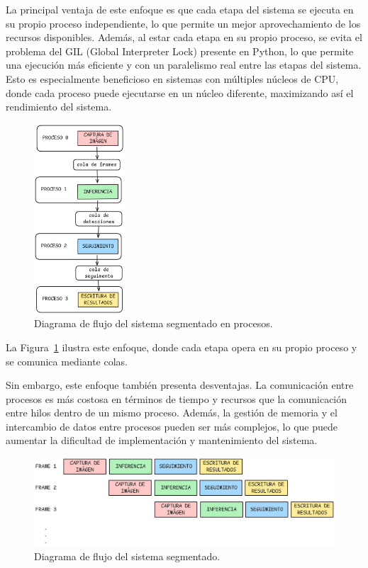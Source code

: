 \documentclass[11pt,spanish,listoffigures,listoftables]{tfgetsinf}
\begin{document}
La principal ventaja de este enfoque es que cada etapa del sistema se ejecuta en su propio proceso independiente, lo que permite un mejor aprovechamiento de los recursos disponibles. Además, al estar cada etapa en su propio proceso, se evita el problema del GIL (Global Interpreter Lock) presente en Python, lo que permite una ejecución más eficiente y con un paralelismo real entre las etapas del sistema. Esto es especialmente beneficioso en sistemas con múltiples núcleos de CPU, donde cada proceso puede ejecutarse en un núcleo diferente, maximizando así el rendimiento del sistema.

\begin{figure}[H]
   \centering
   \includegraphics[width=0.3\textwidth]{images/diseno_e_implementacion/segmentacion_procesos.png}
   \caption{Diagrama de flujo del sistema segmentado en procesos.}
   \label{fig:procesos}
\end{figure}

La Figura~\ref{fig:procesos} ilustra este enfoque, donde cada etapa opera en su propio proceso y se comunica mediante colas.

Sin embargo, este enfoque también presenta desventajas. La comunicación entre procesos es más costosa en términos de tiempo y recursos que la comunicación entre hilos dentro de un mismo proceso. Además, la gestión de memoria y el intercambio de datos entre procesos pueden ser más complejos, lo que puede aumentar la dificultad de implementación y mantenimiento del sistema.

\begin{figure}[H]
   \centering
   \includegraphics[width=1\textwidth]{images/diseno_e_implementacion/segmentacion.png}
   \caption{Diagrama de flujo del sistema segmentado.}
   \label{fig:segmentacion}
\end{figure}
\end{document}
